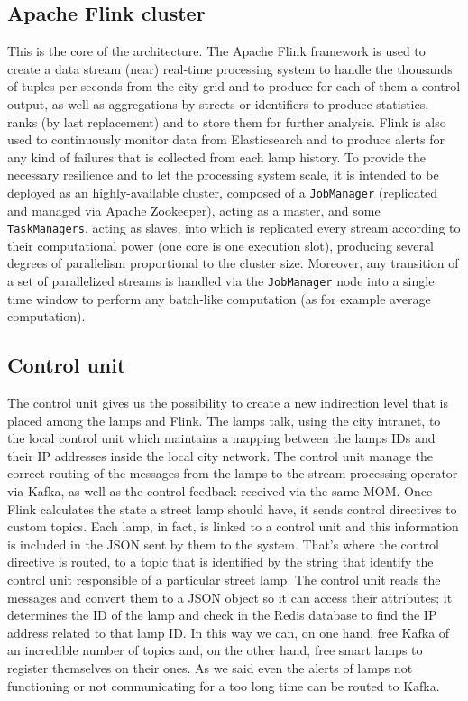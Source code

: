 \subsection{Apache Flink cluster}
This is the core of the architecture. The Apache Flink framework is used to create a data stream (near) real-time processing system to handle the thousands of tuples per seconds from the city grid and to produce for each of them a control output, as well as aggregations by streets or identifiers to produce statistics, ranks (by last replacement) and to store them for further analysis. Flink is also used to continuously monitor data from Elasticsearch and to produce alerts for any kind of failures that is collected from each lamp history. To provide the necessary resilience and to let the processing system scale, it is intended to be deployed as an highly-available cluster, composed of a \texttt{JobManager} (replicated and managed via Apache Zookeeper), acting as a master, and some \texttt{TaskManagers}, acting as slaves, into which is replicated every stream according to their computational power (one core is one execution slot), producing several degrees of parallelism proportional to the cluster size. Moreover, any transition of a set of parallelized streams is handled via the \texttt{JobManager} node into a single time window to perform any batch-like computation (as for example average computation).

\subsection{Control unit}
The control unit gives us the possibility to create a new indirection level that is placed among the lamps and Flink. The lamps talk, using the city intranet, to the local control unit which maintains a mapping between the lamps IDs and their IP addresses inside the local city network. The control unit manage the correct routing of the messages from the lamps to the stream processing operator via Kafka, as well as the control feedback received via the same MOM.
 Once Flink calculates the state a street lamp should have, it sends control directives to custom topics. Each lamp, in fact, is linked to a control unit and this information is included in the JSON sent by them to the system. That’s where the control directive is routed, to a topic that is identified by the string that identify the control unit responsible of a particular street lamp. The control unit reads the messages and convert them to a JSON object so it can access their attributes; it determines the ID of the lamp and check in the Redis database to find the IP address related to that lamp ID.
In this way we can, on one hand, free Kafka of an incredible number of topics and, on the other hand, free smart lamps to register themselves on their ones. As we said even the alerts of lamps not functioning or not communicating for a too long time can be routed to Kafka. 
